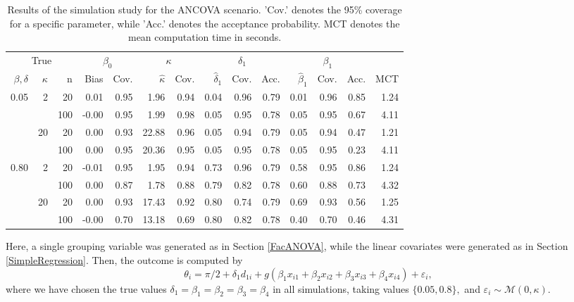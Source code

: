 \documentclass[11pt,a4paper]{article}\usepackage[]{graphicx}\usepackage[]{color}
\begin{document}
\begin{table}[btp]
\centering
\begin{small}
\caption{Results of the simulation study for the ANCOVA scenario. 'Cov.' denotes the 95\% coverage for a specific parameter, while 'Acc.' denotes the acceptance probability. MCT denotes the mean computation time in seconds.} 
\label{tableANCOVA}
\begin{tabular}{rrrrrrrrrrrrrr}
  \toprule \multicolumn{3}{c}{True} & \multicolumn{2}{c}{$\beta_0$} & \multicolumn{2}{c}{$\kappa$} & \multicolumn{3}{c}{$\delta_1$} & \multicolumn{3}{c}{$\beta_1$} \\  \cmidrule(lr){1-3} \cmidrule(lr){4-5} \cmidrule(lr){6-7} \cmidrule(lr){8-10} \cmidrule(lr){11-13}$\beta , \delta$ & $\kappa$ & n & Bias & Cov. & $\hat{\kappa}$ & Cov. & $\hat{\delta}_1$ & Cov. & Acc. & $\hat{\beta}_1$ & Cov. & Acc. & MCT \\ 
  \midrule
0.05 & 2 & 20 & 0.01 & 0.95 & 1.96 & 0.94 & 0.04 & 0.96 & 0.79 & 0.01 & 0.96 & 0.85 & 1.24 \\ 
   \vspace{0.2cm}  &  & 100 & -0.00 & 0.95 & 1.99 & 0.98 & 0.05 & 0.95 & 0.78 & 0.05 & 0.95 & 0.67 & 4.11 \\ 
   & 20 & 20 & 0.00 & 0.93 & 22.88 & 0.96 & 0.05 & 0.94 & 0.79 & 0.05 & 0.94 & 0.47 & 1.21 \\ 
   \vspace{0.2cm}  &  & 100 & 0.00 & 0.95 & 20.36 & 0.95 & 0.05 & 0.95 & 0.78 & 0.05 & 0.95 & 0.23 & 4.11 \\ 
  0.80 & 2 & 20 & -0.01 & 0.95 & 1.95 & 0.94 & 0.73 & 0.96 & 0.79 & 0.58 & 0.95 & 0.86 & 1.24 \\ 
   \vspace{0.2cm}  &  & 100 & 0.00 & 0.87 & 1.78 & 0.88 & 0.79 & 0.82 & 0.78 & 0.60 & 0.88 & 0.73 & 4.32 \\ 
   & 20 & 20 & 0.00 & 0.93 & 17.43 & 0.92 & 0.80 & 0.74 & 0.79 & 0.69 & 0.93 & 0.56 & 1.25 \\ 
   &  & 100 & -0.00 & 0.70 & 13.18 & 0.69 & 0.80 & 0.82 & 0.78 & 0.40 & 0.70 & 0.46 & 4.31 \\ 
   \bottomrule
\end{tabular}
\end{small}
\end{table}

Here, a single grouping variable was generated as in Section \ref{FacANOVA}, while the linear covariates were generated as in Section \ref{SimpleRegression}. Then, the outcome is computed by
\begin{equation}
\theta_i = \pi/2 + \delta_1 d_{1i} + g(\beta_1 x_{i1} + \beta_2 x_{i2} + \beta_3 x_{i3} + \beta_4 x_{i4}) + \varepsilon_i,
\end{equation}
where we have chosen the true values \( \delta_1 = \beta_1 = \beta_2 = \beta_3 = \beta_4 \) in all simulations, taking values \( \{ 0.05, 0.8 \},\) and \( \varepsilon_i \sim \mathcal{M}(0, \kappa).\)
\end{document}
